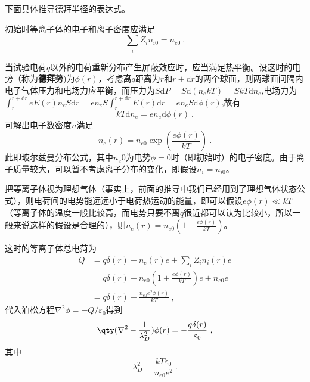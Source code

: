 下面具体推导德拜半径的表达式。

初始时等离子体的电子和离子密度应满足
			\begin{equation} 
			\sum_i Z_i n_{i0}=n_{e0}~.
			\end{equation}
			
当试验电荷$q$以外的电荷重新分布产生屏蔽效应时，应当满足热平衡。设这时的电势（称为\textbf{德拜势})为$\phi(r)$，考虑离$q$距离为$r$和$r+\mathrm{d} r$的两个球面，则两球面间隔内电子气体压力和电场力应平衡，而压力为$S\mathrm{d}P=S\mathrm{d}(n_ekT)=SkT\mathrm{d}n_e$,电场力为$\int_r^{r+\mathrm{d}r} eE(r)n_eS\mathrm{d}r=en_eS\int_r^{r+\mathrm{d}r}E(r)\mathrm{d}r=en_eS\mathrm{d}\phi(r)$,故有
			\begin{equation} 
			kT\mathrm{d}n_e=en_e\mathrm{d}\phi(r)~.
			\end{equation}
可解出电子数密度$n$满足
			\begin{equation} 
			n_e(r)=n_{e0}\exp{\left( \frac{e\phi(r)}{kT}\right)}~.
			\end{equation}
此即玻尔兹曼分布公式，其中$n_e0$为电势$\phi=0$时（即初始时）的电子密度。由于离子质量较大，可以暂不考虑离子分布的变化，即假设$n_i=n_{i0}$。
			
把等离子体视为理想气体（事实上，前面的推导中我们已经用到了理想气体状态公式），则电荷间的电势能远远小于电荷热运动的能量，即可以假设$e\phi(r)\ll kT$（等离子体的温度一般比较高，而电势只要不离$q$很近都可以认为比较小，所以一般来说这样的假设是合理的），则$n_e(r)=n_{e0}(1+\frac{e\phi(r)}{kT})$。
			
这时的等离子体总电菏为
			\begin{equation}
			\begin{aligned} 
			Q&=q\delta(r)-n_e(r)e+\sum_{i} Z_i n_{i}(r)e\\
			&=q\delta(r)-n_{e0}(1+\frac{e\phi(r)}{kT})e+n_{e0}e\\
			&=q\delta(r)-\frac{n_{e0}e^2\phi(r)}{kT}~,
			\end{aligned}
			\end{equation}
代入泊松方程$\nabla^2\phi=-Q/\varepsilon_0$得到
			\begin{equation} 
			\qty(\nabla^2-\frac{1}{\lambda_D^2})\phi(r)=-\frac{q\delta(r)}{\varepsilon_0}~,
			\end{equation}
其中
			\begin{equation}
				\boxed{\lambda_D^2=\frac{kT\varepsilon_0}{n_{e0}e^2}}~.
			\end{equation}
			
